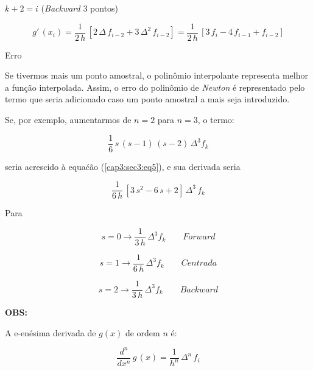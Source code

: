 \begin{enumerar}
$k + 2 = i$ (\textit{Backward} 3 pontos)

\begin{equation}
 \label{cap3:sec3:eq12}
 g'\,(x_i) = \frac{1}{2\,h} \, \left[ 2\,\Delta\,f_{i-2} + 3\,\Delta^2\,f_{i-2} \right] = \frac{1}{2\,h} \, \left[ 3\,f_i - 4\,f_{i-1} + f_{i-2} \right]
\end{equation}

\item Erro

Se tivermos mais um ponto amostral, o polinômio interpolante representa melhor a função interpolada. Assim, o erro do polinômio de \textit{Newton} é representado pelo termo que seria adicionado caso um ponto amostral a mais seja introduzido.

Se, por exemplo, aumentarmos de $n = 2$ para $n = 3$, o termo:

\begin{equation}
 \label{cap3:sec3:eq13}
 \frac{1}{6} \, s\,(s-1)\,(s-2) \, \Delta^3 f_k
\end{equation}

seria acrescido \`a  equa\'c\~ao (\ref{cap3:sec3:eq5}), e sua derivada seria

\begin{equation}
 \label{cap3:sec3:eq14}
 \frac{1}{6\,h} \, \left[ 3\,s^2 - 6\,s + 2 \right] \, \Delta^3 \, f_k
\end{equation}

Para

\begin{equation}
 \label{cap3:sec3:eq15}
 s = 0 \rightarrow \frac{1}{3\,h} \, \Delta^{3}f_{k} \qquad Forward
\end{equation}

\begin{equation}
 \label{cap3:sec3:eq16}
 s = 1 \rightarrow \frac{1}{6\,h} \, \Delta^{3}f_{k} \qquad Centrada
\end{equation}

\begin{equation}
 \label{cap3:sec3:eq17}
 s = 2 \rightarrow \frac{1}{3\,h} \, \Delta^{3}f_{k} \qquad Backward
\end{equation}

\end{enumerar}

\textbf{OBS:}

A e-enésima derivada de $g(x)$ de ordem $n$ é:

\begin{equation}
 \label{cap3:sec3:eq18}
 \frac{d^n}{dx^n} \, g\,(x) = \frac{1}{h^n} \, \Delta^n \, f_i
\end{equation}

